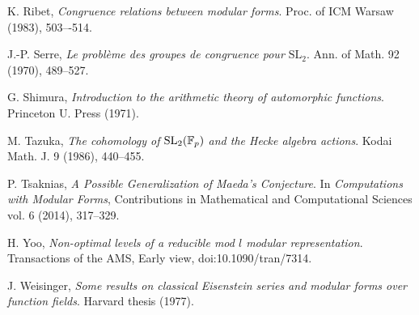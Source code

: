 \documentclass{amsart}
\theoremstyle{plain}
\theoremstyle{definition}
\numberwithin{equation}{section}
\def\SL{\mathrm{SL}} \def\PSL{\mathrm{PSL}}\def\GL{\mathrm{GL}}\def\PGL{\mathrm{PGL}}
\begin{document}
\begin{thebibliography}{99}
  K. Ribet, \emph{Congruence relations between modular forms}. 
Proc. of ICM Warsaw (1983), 503–-514.

 J.-P. Serre, \emph{Le probl\`eme des groupes de congruence pour $\SL_2$}. 
Ann. of Math. 92 (1970), 489--527.


 G. Shimura, \emph{Introduction to the arithmetic theory of automorphic
functions}. Princeton U. Press (1971).

 M. Tazuka, \emph{The cohomology of $\SL_2(\FF_p)$ and the Hecke 
algebra actions}. Kodai Math. J. 9 (1986), 440--455. 

 P. Tsaknias, \emph{A Possible Generalization of Maeda's 
Conjecture}. In \emph{Computations with Modular Forms}, Contributions 
in Mathematical and Computational Sciences vol. 6 (2014), 317--329.

 H. Yoo, \emph{Non-optimal levels of a reducible mod $l$ modular 
representation}. Transactions of the AMS, Early view, doi:10.1090/tran/7314.

 J. Weisinger, \emph{Some results on classical Eisenstein series and 
modular forms over function fields}. Harvard thesis (1977).
\end{thebibliography}
\end{document}
